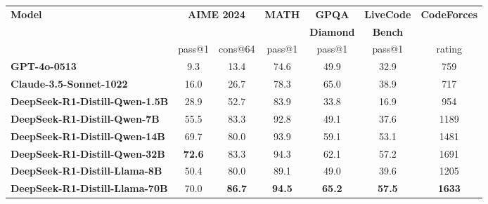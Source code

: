 \begin{table}[h]
    \centering
    \setlength{\tabcolsep}{2pt}
    \label{tab:distill}
        \begin{tabularx}{\textwidth}{@{}l *{6}{c}@{}}
        \toprule
        \multirow{3}{*}{\centering\textbf{Model}} & \multicolumn{2}{c}{\multirow{2}{*}{\textbf{\footnotesize{AIME 2024}}}} & \multirow{2}{*}{\textbf{\footnotesize{MATH}}} & \textbf{\footnotesize{GPQA}} & \textbf{\footnotesize{LiveCode}} & \multirow{2}{*}{\footnotesize{\textbf{CodeForces}}} \\
        &  &  &  & \textbf{\footnotesize{Diamond}} & \textbf{\footnotesize{Bench}} & \\
        \cmidrule(lr){2-3}
         & pass@1 & cons@64 & pass@1 & pass@1 & pass@1 & rating \\
        \midrule
        \textbf{GPT-4o-0513} & 9.3 & 13.4 & 74.6  & 49.9 & 32.9 &  759\\
        \textbf{Claude-3.5-Sonnet-1022} & 16.0 & 26.7 & 78.3  & 65.0 & 38.9 &  717\\
        \midrule
        \textbf{DeepSeek-R1-Distill-Qwen-1.5B} & 28.9 & 52.7 & 83.9 & 33.8 & 16.9 & 954 \\
        \textbf{DeepSeek-R1-Distill-Qwen-7B} & 55.5 & 83.3 & 92.8 & 49.1 & 37.6 & 1189 \\
        \textbf{DeepSeek-R1-Distill-Qwen-14B} & 69.7 & 80.0 & 93.9 &  59.1 & 53.1 & 1481 \\
        \textbf{DeepSeek-R1-Distill-Qwen-32B} & \textbf{72.6} & {83.3} & {94.3} & {62.1} & {57.2} & 1691 \\
        \textbf{DeepSeek-R1-Distill-Llama-8B} & 50.4 & 80.0 & 89.1 & 49.0 & 39.6 & 1205 \\
        \textbf{DeepSeek-R1-Distill-Llama-70B} & 70.0 & \textbf{86.7} & \textbf{94.5} & \textbf{65.2} & \textbf{57.5} & \textbf{1633} \\
        \bottomrule
    \end{tabularx}
\end{table}